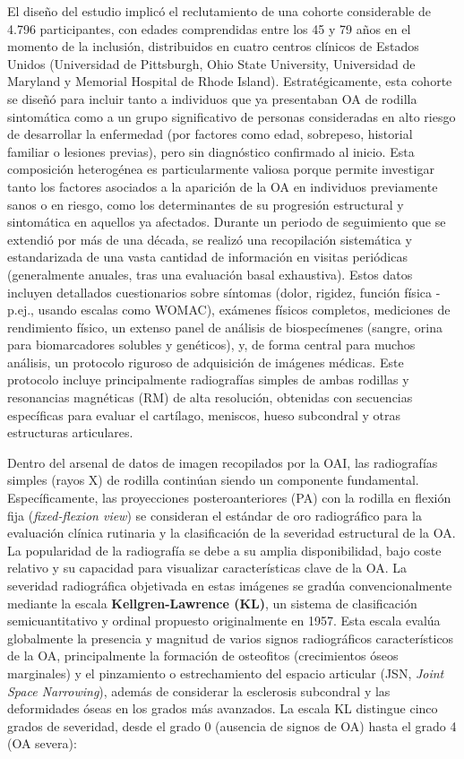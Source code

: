 \documentclass[11pt,spanish,listoffigures,listoftables]{tfgetsinf}
\begin{document}
El diseño del estudio implicó el reclutamiento de una cohorte considerable de 4.796 participantes, con edades comprendidas entre los 45 y 79 años en el momento de la inclusión, 
distribuidos en cuatro centros clínicos de Estados Unidos (Universidad de Pittsburgh, Ohio State University, Universidad de Maryland y Memorial Hospital de Rhode Island). 
Estratégicamente, esta cohorte se diseñó para incluir tanto a individuos que ya presentaban OA de rodilla sintomática como a un grupo significativo de 
personas consideradas en alto riesgo de desarrollar la enfermedad (por factores como edad, sobrepeso, historial familiar o lesiones previas), pero sin diagnóstico confirmado 
al inicio. Esta composición heterogénea es particularmente valiosa porque permite investigar tanto los factores asociados a la aparición de la OA en individuos previamente 
sanos o en riesgo, como los determinantes de su progresión estructural y sintomática en aquellos ya afectados. Durante un periodo de seguimiento que se extendió por más de 
una década, se realizó una recopilación sistemática y estandarizada de una vasta cantidad de información en visitas periódicas (generalmente anuales, tras una evaluación basal 
exhaustiva). Estos datos incluyen detallados cuestionarios sobre síntomas (dolor, rigidez, función física - p.ej., usando escalas como WOMAC), exámenes físicos completos, 
mediciones de rendimiento físico, un extenso panel de análisis de biospecímenes (sangre, orina para biomarcadores solubles y genéticos), y, de forma central para muchos 
análisis, un protocolo riguroso de adquisición de imágenes médicas. Este protocolo incluye principalmente radiografías simples de ambas rodillas y resonancias magnéticas (RM) 
de alta resolución, obtenidas con secuencias específicas para evaluar el cartílago, meniscos, hueso subcondral y otras estructuras articulares.

Dentro del arsenal de datos de imagen recopilados por la OAI, las radiografías simples (rayos X) de rodilla continúan siendo un componente fundamental. Específicamente, 
las proyecciones posteroanteriores (PA) con la rodilla en flexión fija (\textit{fixed-flexion view}) se consideran el estándar de oro radiográfico para la evaluación clínica 
rutinaria y la clasificación de la severidad estructural de la OA. La popularidad de la radiografía se debe a su amplia disponibilidad, bajo 
coste relativo y su capacidad para visualizar características clave de la OA. La severidad radiográfica objetivada en estas imágenes se gradúa convencionalmente mediante la 
escala \textbf{Kellgren-Lawrence (KL)}, un sistema de clasificación semicuantitativo y ordinal propuesto originalmente en 1957. Esta escala 
evalúa globalmente la presencia y magnitud de varios signos radiográficos característicos de la OA, principalmente la formación de osteofitos (crecimientos óseos marginales) 
y el pinzamiento o estrechamiento del espacio articular (JSN, \textit{Joint Space Narrowing}), además de considerar la esclerosis subcondral y las deformidades óseas en los 
grados más avanzados. La escala KL distingue cinco grados de severidad, desde el grado 0 (ausencia de signos de OA) hasta el grado 4 (OA severa):
\end{document}
